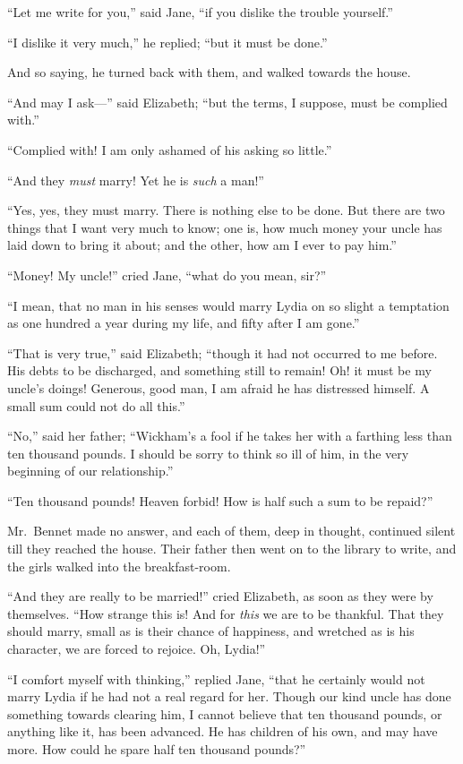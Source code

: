 ``Let me write for you,'' said Jane, ``if you dislike the trouble
yourself.''

``I dislike it very much,'' he replied; ``but it must be done.''

And so saying, he turned back with them, and walked towards
the house.

``And may I ask---'' said Elizabeth; ``but the terms, I suppose,
must be complied with.''

``Complied with!  I am only ashamed of his asking so little.''

``And they \emph{must} marry!  Yet he is \emph{such} a man!''

``Yes, yes, they must marry.  There is nothing else to be done.
But there are two things that I want very much to know; one is,
how much money your uncle has laid down to bring it about;
and the other, how am I ever to pay him.''

``Money!  My uncle!'' cried Jane, ``what do you mean, sir?''

``I mean, that no man in his senses would marry Lydia on so
slight a temptation as one hundred a year during my life, and
fifty after I am gone.''

``That is very true,'' said Elizabeth; ``though it had not occurred
to me before.  His debts to be discharged, and something still
to remain!  Oh! it must be my uncle's doings!  Generous, good
man, I am afraid he has distressed himself.  A small sum could
not do all this.''

``No,'' said her father; ``Wickham's a fool if he takes her with a
farthing less than ten thousand pounds.  I should be sorry to
think so ill of him, in the very beginning of our relationship.''

``Ten thousand pounds!  Heaven forbid!  How is half such a
sum to be repaid?''

Mr.\ Bennet made no answer, and each of them, deep in thought,
continued silent till they reached the house.  Their father then
went on to the library to write, and the girls walked into the
breakfast-room.

``And they are really to be married!'' cried Elizabeth, as soon
as they were by themselves.  ``How strange this is!  And for
\emph{this} we are to be thankful.  That they should marry, small as
is their chance of happiness, and wretched as is his character,
we are forced to rejoice.  Oh, Lydia!''

``I comfort myself with thinking,'' replied Jane, ``that he certainly
would not marry Lydia if he had not a real regard for her.
Though our kind uncle has done something towards clearing
him, I cannot believe that ten thousand pounds, or anything like
it, has been advanced.  He has children of his own, and may
have more.  How could he spare half ten thousand pounds?''

